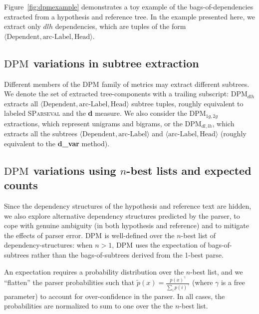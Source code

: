 \documentclass[11pt]{article}
\newcommand{\DPM}[1]{\ensuremath{\mathrm{DPM}_{#1}}}
\newcommand{\DPMempty}{\ensuremath{\DPM{}}}
\begin{document}
Figure~\ref{fig:dpmexample} demonstrates a toy example of the
bags-of-dependencies extracted from a hypothesis and reference
tree.  In the example presented here, we extract only $dlh$
dependencies, which are tuples of the form $\langle \textrm{Dependent},
\textrm{arc-Label}, \textrm{Head} \rangle$.

\subsection{\DPMempty{} variations in subtree extraction}
Different members of the \DPMempty{} family of metrics may extract
different subtrees.  We denote the set of extracted tree-components
with a trailing subscript: \DPM{dlh} extracts all $\langle
\textrm{Dependent}, \textrm{arc-Label}, \textrm{Head} \rangle$ subtree
tuples, roughly equivalent to labeled \textsc{SParseval}
\cite{roark06:sparseval} and the 
\textbf{d} measure. We also consider the $\DPM{1g,2g}$ extractions,
which represent unigrams and bigrams, or the \DPM{dl,lh}, which
extracts all the subtrees $\langle \textrm{Dependent},
\textrm{arc-Label} \rangle$ and $\langle \textrm{arc-Label},
\textrm{Head} \rangle$ (roughly equivalent to the
 \textbf{d\_var} method).

\subsection{\DPMempty{} variations using $n$-best lists and expected counts}
Since the dependency structures of the hypothesis and reference text
are hidden, we also  explore alternative
dependency structures predicted by the parser, to cope with genuine
ambiguity (in both hypothesis and reference) and to
mitigate the effects of parser error. \DPMempty{} is well-defined over
the $n$-best list of dependency-structures: when $n>1$, \DPMempty{}
uses the expectation of bags-of-subtrees rather than the
bags-of-subtrees derived from the 1-best parse.

An expectation requires a probability distribution over the $n$-best
list, and we ``flatten'' the parser probabilities such that
$\tilde{p}(x) = \frac{p(x)^\gamma}{\sum_ip(i)^\gamma}$ (where $\gamma$
is a free parameter) to account for over-confidence in the parser.  In
all cases, the probabilities are normalized to sum to one over the the
$n$-best list.
\end{document}
